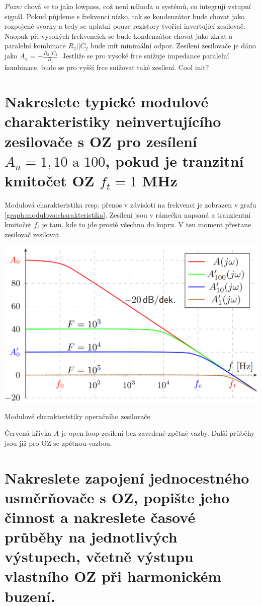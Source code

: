 \documentclass[a4paper,12pt]{article}   %
\begin{document}
\textit{Pozn:} chová se to jako lowpass, což není náhoda u systémů, co integrují vstupní signál. Pokud půjdeme s frekvencí nízko, tak se kondenzátor bude chovat jako rozpojené svorky a tedy se uplatní pouze rezistory tvořící invertující zesilovač. Naopak při vysokých frekvencích se bude kondenzátor chovat jako zkrat a paralelní kombinace $R_2||C_2$ bude mít minimální odpor. Zesílení zesilovače je dáno jako $A_u = -\frac{R_2||C_2}{R_1}$. Jestliže se pro vysoké frce snižuje impedance paralelní kombinace, bude se pro vyšší frce snižovat také zesílení. Cool init?






\section{Nakreslete typické modulové charakteristiky neinvertujícího zesilovače s OZ pro zesílení $A_u = 1, 10 \text{ a } 100$, pokud je tranzitní kmitočet OZ $f_t=1$ MHz}
Modulová charakteristika resp. přenos v závisloti na frekvenci je zobrazen v grafu \ref{graph:modulova:charakteristika}. Zesílení jsou v rámečku napsaná a tranzientní kmitočet $f_t$ je tam, kde to jde prostě všechno do kopru. V ten moment přestane zesilovač zesilovat.
\begin{graf}
    \centering
    \includegraphics[width=.7\textwidth]{opamp-modulove_charakteristiky.PNG}
    \caption{Modulové charakteristiky operačního zesilovače}
    \label{graph:modulova:charakteristika}
\end{graf}

Červená křivka $A$ je open loop zesílení bez zavedené zpětné vazby. Další průběhy jsou již pro OZ se zpětnou vazbou.








\section{Nakreslete zapojení jednocestného usměrňovače s OZ, popište jeho činnost a nakreslete časové průběhy na jednotlivých výstupech, včetně výstupu vlastního OZ při harmonickém buzení.}
\end{document}
